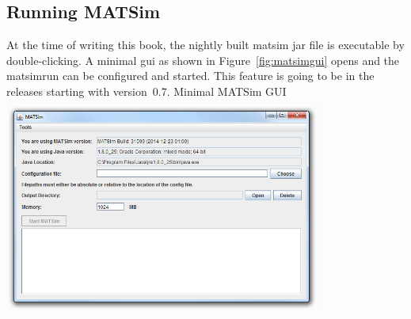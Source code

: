\subsection{Running MATSim}
\label{sec:runexample}
At the time of writing this book, the nightly built \gls{matsim} \gls{jar} file is executable by double-clicking. A minimal \gls{gui} as shown in Figure~\ref{fig:matsimgui} opens and the \gls{matsimrun} can be configured and started. 
This feature is going to be in the releases starting with version~0.7.
%
%
{Minimal MATSim GUI}%
{\label{fig:matsimgui}}%
{\includegraphics[width=0.8\textwidth, angle=0]{using/figures/matsimgui.png}}%
{}


